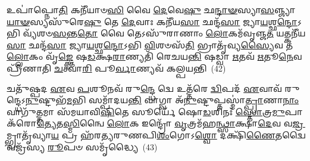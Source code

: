 𑌉𑌪𑌾॑𑌪𑍍𑌨𑍋\-\ul{𑌤𑌿} 𑌕𑌨𑍀᳴𑌯𑌾𑍞\-\ul{𑌸𑌿} 𑌵𑍈 \ul{𑌦𑍇}\-𑌵𑍇\-\ul{𑌷𑍁} 𑌛\-\ul{𑌨𑍍𑌦𑌾}\-\-\ul{𑍟}\-𑌸𑍍𑌯𑌾\-\ul{𑌸}\-𑌞𑍍𑌜𑍍𑌯𑌾\-\ul{𑌯𑌾}\-\-\ul{𑍟}\-𑌸𑍍𑌯𑌸𑍁᳴𑌰𑍇\-\ul{𑌷𑍁} 𑌤𑍇 \ul{𑌦𑍇}\-𑌵𑌾𑌃 𑌕𑌨𑍀᳴𑌯\-\ul{𑌸𑌾} 𑌛𑌨𑍍𑌦᳴\-\ul{𑌸𑌾} 𑌜𑍍𑌯𑌾\-\ul{𑌯}\-𑌶𑍍𑌛\-\ul{𑌨𑍍𑌦𑍋}\-\-𑌽𑌭𑌿 𑌵𑍍𑌯᳴𑌶𑍞\-\ul{𑌸}\-𑌨𑍍𑌤\-\ul{𑌤𑍋} 𑌵𑍈 𑌤𑍇\-𑌽𑌸𑍁᳴𑌰𑌾𑌣𑌾𑌂 \ul{𑌲𑍋}\-𑌕𑌮᳴𑌵𑍃𑌞𑍍𑌜\-\ul{𑌤} 𑌯𑌤𑍍𑌕𑌨𑍀᳴𑌯\-\ul{𑌸𑌾} 𑌛𑌨𑍍𑌦᳴\-\ul{𑌸𑌾} 𑌜𑍍𑌯𑌾\-\ul{𑌯}\-𑌶𑍍𑌛\-\ul{𑌨𑍍𑌦𑍋}\-\-𑌽𑌭𑌿 \ul{𑌵𑌿}\-𑌶𑍞𑌸᳴\-\ul{𑌤𑌿} 𑌭𑍍𑌰𑌾𑌤𑍃᳴𑌵𑍍𑌯\-\ul{𑌸𑍍𑌯𑍈}\-𑌵 𑌤\-\ul{𑌲𑍍𑌲𑍋}\-𑌕𑌂 𑌵𑍃᳴\-\ul{𑌙𑍍𑌕𑍍𑌤𑍇} 𑌷\-\ul{𑌡}\-𑌕𑍍𑌷\-\ul{𑌰𑌾}\-𑌣𑍍𑌯𑌤𑌿᳴ 𑌰𑍇𑌚𑌯\-\ul{𑌨𑍍𑌤𑌿} 𑌷𑌡𑍍𑌵𑌾 \ul{𑌋}\-𑌤𑌵᳴ \ul{𑌋}\-𑌤𑍂\-\ul{𑌨𑍇}\-𑌵 𑌪𑍍𑌰𑍀᳴𑌣𑌾𑌤𑌿 \ul{𑌚}\-𑌤𑍍𑌵𑌾\-\ul{𑌰𑌿} 𑌪𑍂\-\ul{𑌰𑍍𑌵𑌾}\-𑌣𑍍𑌯𑌵᳴ 𑌕𑌲𑍍𑌪𑌯𑌨𑍍𑌤𑌿~(42)

𑌚𑌤𑍁᳴𑌷𑍍𑌪𑌦 \ul{𑌏}\-𑌵 \ul{𑌪}\-𑌶𑍂𑌨𑌵᳴ 𑌰𑍁\-\ul{𑌨𑍍𑌦𑍍𑌧𑍇} 𑌦𑍍𑌵𑍇 𑌉𑌤𑍍𑌤᳴𑌰𑍇 \ul{𑌦𑍍𑌵𑌿}\-𑌪𑌦᳴ \ul{𑌏}\-𑌵𑌾𑌵᳴ 𑌰𑍁𑌨𑍍𑌦𑍍𑌧𑍇\-𑌽\-\ul{𑌨𑍁}\-𑌷𑍍𑌟𑍁𑌭᳴\-\ul{𑌮}\-𑌭𑌿 𑌸𑌮𑍍𑌪𑌾᳴𑌦𑌯\-\ul{𑌨𑍍𑌤𑌿} 𑌵𑌾𑌗𑍍𑌵𑌾 𑌅᳴\-\ul{𑌨𑍁}\-𑌷𑍍𑌟𑍁𑌪𑍍𑌤𑌸𑍍𑌮𑌾॑\-\ul{𑌤𑍍𑌪𑍍𑌰𑌾}\-𑌣𑌾\-\ul{𑌨𑌾𑌂} 𑌵𑌾𑌗𑍁᳴\-\ul{𑌤𑍍𑌤}\-𑌮𑌾 𑌸᳴𑌮𑌯𑌾𑌵𑌿\-\ul{𑌷𑌿}\-𑌤𑍇 𑌸𑍂𑌰𑍍𑌯𑍇᳴ 𑌷𑍋\-\ul{𑌡}\-𑌶𑌿𑌨𑌃᳴ \ul{𑌸𑍍𑌤𑍋}\-𑌤𑍍𑌰\-\ul{𑌮𑍁}\-𑌪𑌾𑌕᳴𑌰𑍋\-\ul{𑌤𑍍𑌯𑍇}\-𑌤\-\ul{𑌸𑍍𑌮𑌿}\-𑌨𑍍𑌵𑍈 \ul{𑌲𑍋}\-𑌕 𑌇𑌨𑍍𑌦𑍍𑌰𑍋᳴ \ul{𑌵𑍃}\-𑌤𑍍𑌰𑌮᳴𑌹\-\ul{𑌨𑍍𑌥𑍍𑌸𑌾}\-𑌕𑍍𑌷𑌾\-\ul{𑌦𑍇}\-𑌵 𑌵\-\ul{𑌜𑍍𑌰}\-𑌮𑍍𑌭𑍍𑌰𑌾𑌤𑍃᳴𑌵𑍍𑌯𑌾\-\ul{𑌯} 𑌪𑍍𑌰 𑌹᳴𑌰𑌤𑍍𑌯𑌰𑍁𑌣𑌪𑌿\-\ul{𑌶𑌂}\-𑌗𑍋\-𑌽\-\ul{𑌶𑍍𑌵𑍋} 𑌦𑌕𑍍𑌷𑌿᳴\-\ul{𑌣𑍈}\-𑌤𑌦𑍍𑌵𑍈 𑌵𑌜𑍍𑌰᳴𑌸𑍍𑌯 \ul{𑌰𑍂}\-𑌪𑍞 𑌸𑌮𑍃᳴𑌦𑍍𑌧𑍍𑌯𑍈~(43)


{}%

